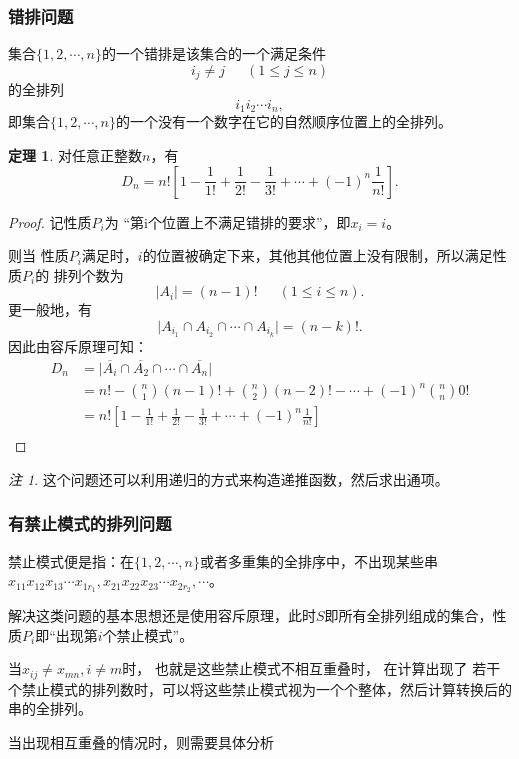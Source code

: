 \documentclass[a4paper,11pt]{article}%
\theoremstyle{remark}
\newtheorem*{remark}{注}
\theoremstyle{remark}
\theoremstyle{definition}
\newtheorem{theorem}{定理}[section]
\theoremstyle{definition}
\theoremstyle{definition}
\newcommand*{\abs}[1]{\lvert #1 \rvert}
\begin{document}
\subsubsection{错排问题}
集合$\{1,2,\cdots,n\}$的一个错排是该集合的一个满足条件 
\[i_j\neq j\phantom{111}(1\leq j\leq n)\]
的全排列 
\[ i_1i_2\cdots i_n,\]
即集合$\{1,2,\cdots,n\}$的一个没有一个数字在它的自然顺序位置上的全排列。
\begin{theorem}
    对任意正整数$n$，有 
    \[ D_n=n![1-\frac{1}{1!}+\frac{1}{2!}-\frac{1}{3!}+\cdots +(-1)^n\frac{1}{n!}].\]
    \begin{proof}
        记性质$P_i$为 “第i个位置上不满足错排的要求”，即$x_i=i$。
        
        则当 性质$P_i$满足时，$i$的位置被确定下来，其他其他位置上没有限制，所以满足性质$P_i$的
        排列个数为 
        \[\abs{A_i}=(n-1)!\phantom{111}(1\leq i\leq n).\]
        更一般地，有 
        \[\abs{A_{i_1}\cap A_{i_2}\cap \cdots \cap A_{i_k}}=(n-k)!.\]
        因此由容斥原理可知：
        \[ 
            \begin{array}{rl}
                D_n&=\abs{\overline{A_i}\cap \overline{A_2}\cap \cdots \cap\overline{A_n}}\\
                & = n!-\binom{n}{1}(n-1)!+\binom{n}{2}(n-2)!-\cdots +(-1)^n\binom{n}{n}0!\\
                &=n![1-\frac{1}{1!}+\frac{1}{2!}-\frac{1}{3!}+\cdots +(-1)^n\frac{1}{n!}]\\
            \end{array}\]
    \end{proof}
\end{theorem}
\begin{remark}
    这个问题还可以利用递归的方式来构造递推函数，然后求出通项。
\end{remark}
\subsubsection{有禁止模式的排列问题}
禁止模式便是指：在$\{1,2,\cdots,n\}$或者多重集的全排序中，不出现某些串$x_{11}x_{12}x_{13}\cdots x_{1r_1},x_{21}x_{22}x_{23}\cdots x_{2r_2},\cdots$。

解决这类问题的基本思想还是使用容斥原理，此时$S$即所有全排列组成的集合，性质$P_i$即“出现第$i$个禁止模式”。

当$x_{ij}\neq x_{mn}, i\neq m$时， 也就是这些禁止模式不相互重叠时， 在计算出现了 若干个禁止模式的排列数时，可以将这些禁止模式视为一个个整体，然后计算转换后的串的全排列。

当出现相互重叠的情况时，则需要具体分析 
\end{document}
